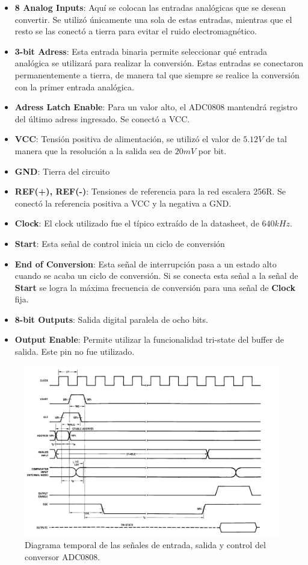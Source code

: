 \begin{itemize}
\item \textbf{8 Analog Inputs}: Aquí se colocan las entradas analógicas que se desean convertir. Se utilizó únicamente una sola de estas entradas, mientras que el resto se las conectó a tierra para evitar el ruido electromagnético.
\item \textbf{3-bit Adress}: Esta entrada binaria permite seleccionar qué entrada analógica se utilizará para realizar la conversión. Estas entradas se conectaron permanentemente a tierra, de manera tal que siempre se realice la conversión con la primer entrada analógica.
\item \textbf{Adress Latch Enable}: Para un valor alto, el ADC0808 mantendrá registro del último adress ingresado. Se conectó a VCC.
\item \textbf{VCC}: Tensión positiva de alimentación, se utilizó el valor de $5.12V$ de tal manera que la resolución a la salida sea de $20mV$ por bit.
\item \textbf{GND}: Tierra del circuito
\item \textbf{REF(+), REF(-)}: Tensiones de referencia para la red escalera 256R. Se conectó la referencia positiva a VCC y la negativa a GND.
\item \textbf{Clock}: El clock utilizado fue el típico extraído de la datasheet, de $640kHz$.
\item \textbf{Start}: Esta señal de control inicia un ciclo de conversión
\item \textbf{End of Conversion}: Esta señal de interrupción pasa a un estado alto cuando se acaba un ciclo de conversión. Si se conecta esta señal a la señal de \textbf{Start} se logra la máxima frecuencia de conversión para una señal de \textbf{Clock} fija.
\item \textbf{8-bit Outputs}: Salida digital paralela de ocho bits.
\item \textbf{Output Enable}: Permite utilizar la funcionalidad tri-state del buffer de salida. Este pin no fue utilizado.
\end{itemize}

\begin{figure}[H]
\centering
\includegraphics[width=0.9\linewidth]{ImagenesEjercicio1/ADC_TIMING.png}
\caption{Diagrama temporal de las señales de entrada, salida y control del conversor ADC0808.}
\label{ADC_TIMING}
\end{figure}

